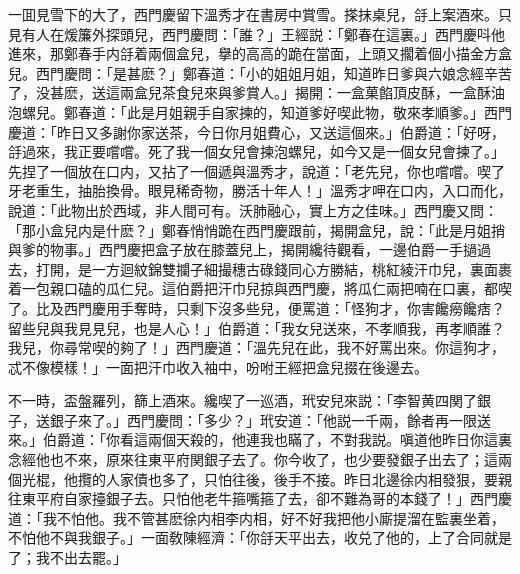 一囬見雪下的大了，西門慶留下溫秀才在書房中賞雪。搽抹桌兒，㧱上案酒來。只見有人在煖簾外探頭兒，西門慶問：「誰？」王經説：「鄭春在這裏。」西門慶呌他進來，那鄭春手内㧱着兩個盒兒，擧的高高的跪在當面，上頭又擱着個小描金方盒兒。西門慶問：「是甚麽？」鄭春道：「小的姐姐月姐，知道昨日爹與六娘念經辛苦了，没甚麽，送這兩盒兒茶食兒來與爹賞人。」揭開：一盒菓餡頂皮酥，一盒酥油泡螺兒。鄭春道：「此是月姐親手自家揀的，知道爹好喫此物，敬來孝順爹。」西門慶道：「昨日又多謝你家送茶，今日你月姐費心，又送這個來。」伯爵道：「好呀，㧱過來，我正要嚐嚐。死了我一個女兒會揀泡螺兒，如今又是一個女兒會揀了。」先捏了一個放在口内，又拈了一個遞與溫秀才，說道：「老先兒，你也嚐嚐。喫了牙老重生，抽胎換骨。眼見稀奇物，勝活十年人！」溫秀才呷在口内，入口而化，說道：「此物出於西域，非人間可有。沃肺融心，實上方之佳味。」西門慶又問：「那小盒兒内是什麽？」鄭春悄悄跪在西門慶跟前，揭開盒兒，說：「此是月姐捎與爹的物事。」西門慶把盒子放在膝蓋兒上，揭開纔待觀看，一邊伯爵一手撾過去，打開，是一方迴紋錦雙攔子細撮穗古碌錢同心方勝結，桃紅綾汗巾兒，裏面裹着一包親口磕的瓜仁兒。這伯爵把汗巾兒掠與西門慶，將瓜仁兩把喃在口裏，都喫了。比及西門慶用手奪時，只剩下沒多些兒，便罵道：「怪狗才，你害饞癆饞痞？留些兒與我見見兒，也是人心！」伯爵道：「我女兒送來，不孝順我，再孝順誰？我兒，你尋常喫的夠了！」西門慶道：「溫先兒在此，我不好罵出來。你這狗才，忒不像模樣！」一面把汗巾收入袖中，吩咐王經把盒兒掇在後邊去。

不一時，盃盤羅列，篩上酒來。纔喫了一巡酒，玳安兒來説：「李智黄四関了銀子，送銀子來了。」西門慶問：「多少？」玳安道：「他説一千兩，餘者再一限送來。」伯爵道：「你看這兩個天殺的，他連我也瞞了，不對我説。嗔道他昨日你這裏念經他也不來，原來往東平府関銀子去了。你今收了，也少要發銀子出去了；這兩個光棍，他攬的人家債也多了，只怕往後，後手不接。昨日北邊徐内相發狠，要親往東平府自家擡銀子去。只怕他老牛箍嘴箍了去，卻不難為哥的本錢了！」西門慶道：「我不怕他。我不管甚麽徐内相李内相，好不好我把他小廝提溜在監裏坐着，不怕他不與我銀子。」一面敎陳經濟：「你㧱天平出去，收兑了他的，上了合同就是了；我不出去罷。」

